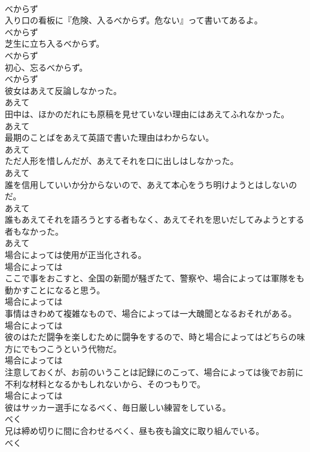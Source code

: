 \documentclass[8pt]{extreport}
\begin{document}
\begin{CJK}{UTF8}{min}
\\	べからず	
\\	入り口の看板に『危険、入るべからず。危ない』って書いてあるよ。	
\\	べからず	
\\	芝生に立ち入るべからず。	
\\	べからず	
\\	初心、忘るべからず。	
\\	べからず	
\\	彼女はあえて反論しなかった。	
\\	あえて	
\\	田中は、ほかのだれにも原稿を見せていない理由にはあえてふれなかった。	
\\	あえて	
\\	最期のことばをあえて英語で書いた理由はわからない。	
\\	あえて	
\\	ただ人形を惜しんだが、あえてそれを口に出しはしなかった。	
\\	あえて	
\\	誰を信用していいか分からないので、あえて本心をうち明けようとはしないのだ。	
\\	あえて	
\\	誰もあえてそれを語ろうとする者もなく、あえてそれを思いだしてみようとする者もなかった。	
\\	あえて	
\\	場合によっては使用が正当化される。	
\\	場合によっては	
\\	ここで事をおこすと、全国の新聞が騒ぎたて、警察や、場合によっては軍隊をも動かすことになると思う。	
\\	場合によっては	
\\	事情はきわめて複雑なもので、場合によっては一大醜聞となるおそれがある。	
\\	場合によっては	
\\	彼のはただ闘争を楽しむために闘争をするので、時と場合によってはどちらの味方にでもつこうという代物だ。	
\\	場合によっては	
\\	注意しておくが、お前のいうことは記録にのこって、場合によっては後でお前に不利な材料となるかもしれないから、そのつもりで。	
\\	場合によっては	
\\	彼はサッカー選手になるべく、毎日厳しい練習をしている。	
\\	べく	
\\	兄は締め切りに間に合わせるべく、昼も夜も論文に取り組んでいる。	
\\	べく	

\end{CJK}
\end{document}
